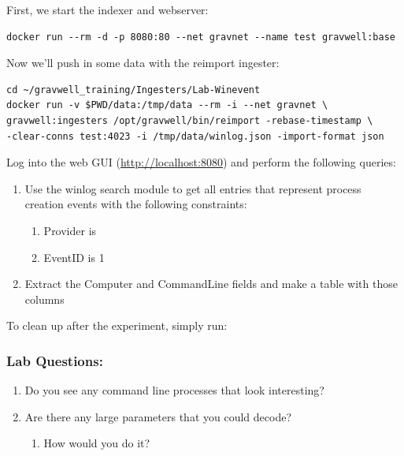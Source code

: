 First, we start the indexer and webserver:

\begin{Verbatim}[breaklines=true]
docker run --rm -d -p 8080:80 --net gravnet --name test gravwell:base
\end{Verbatim}

Now we'll push in some data with the reimport ingester:

\begin{Verbatim}[breaklines=true]
cd ~/gravwell_training/Ingesters/Lab-Winevent
docker run -v $PWD/data:/tmp/data --rm -i --net gravnet \
gravwell:ingesters /opt/gravwell/bin/reimport -rebase-timestamp \
-clear-conns test:4023 -i /tmp/data/winlog.json -import-format json
\end{Verbatim}

Log into the web GUI (\href{http://localhost:8080}{http://localhost:8080}) and perform the following queries:

\begin{enumerate}
\item Use the winlog search module to get all entries that represent process creation events with the following constraints:
	\begin{enumerate}
	\item Provider is \code{Microsoft-Windows-Sysmon}
	\item EventID is 1
	\end{enumerate}
\item Extract the Computer and CommandLine fields and make a table with those columns
\end{enumerate}

To clean up after the experiment, simply run:



\subsubsection{Lab Questions:}

\begin{enumerate}
\item Do you see any command line processes that look interesting?
\item Are there any large parameters that you could decode?
	\begin{enumerate}
	\item How would you do it?
	\end{enumerate}
\end{enumerate}

